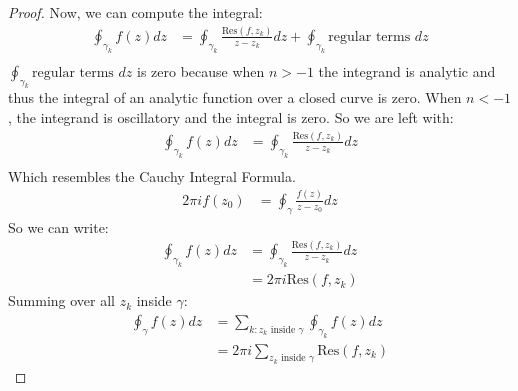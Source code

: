 \begin{proof}
    Now, we can compute the integral:
    \begin{align*}
        \oint_{\gamma_k} f(z) dz & = \oint_{\gamma_k} \frac{\text{Res}(f, z_k)}{z - z_k} dz + \oint_{\gamma_k} \text{regular terms } dz \\
    \end{align*}
    $\oint_{\gamma_k} \text{regular terms } dz$ is zero because when $n > -1$ the integrand is analytic and thus the integral of an analytic function over a closed curve is zero. When $n < -1$, the integrand is oscillatory and the integral is zero. So we are left with:
    \begin{align*}
        \oint_{\gamma_k} f(z) dz & = \oint_{\gamma_k} \frac{\text{Res}(f, z_k)}{z - z_k} dz \\
    \end{align*}
    Which resembles the Cauchy Integral Formula.
    \begin{align*}
        2\pi i f(z_0) & = \oint_{\gamma} \frac{f(z)}{z - z_0} dz
    \end{align*}
    So we can write:
    \begin{align*}
        \oint_{\gamma_k} f(z) dz & = \oint_{\gamma_k} \frac{\text{Res}(f, z_k)}{z - z_k} dz \\
                                 & = 2\pi i \text{Res}(f, z_k)
    \end{align*}
    Summing over all $z_k$ inside $\gamma$:
    \begin{align*}
        \oint_{\gamma} f(z) dz & = \sum_{k : z_k \text{ inside } \gamma} \oint_{\gamma_k} f(z) dz \\
                               & = 2\pi i \sum_{z_k \text{ inside } \gamma} \text{Res}(f, z_k)
    \end{align*}
\end{proof}

